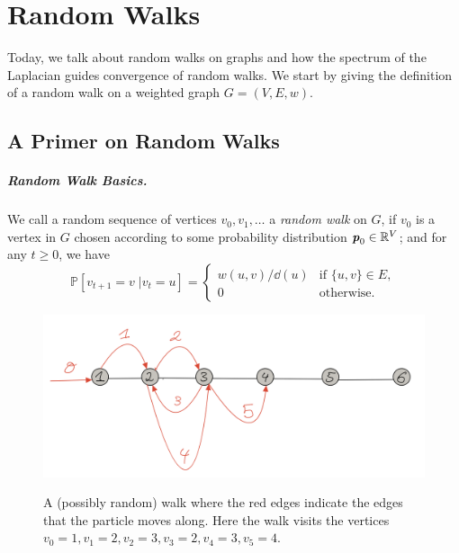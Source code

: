 \newcommand\WWtil{{\tilde{\mathbf{W}}}}
\newcommand\hh{{\boldsymbol{\mathit{h}}}}

\chapter{Random Walks}

\sloppy

Today, we talk about random walks on graphs and how the spectrum of the Laplacian guides convergence of random walks. We start by giving the definition of a random walk on a weighted graph $G=(V,E,w)$.

\section{A Primer on Random Walks}

\paragraph{Random Walk Basics.} We call a random sequence of vertices $v_0, v_1, \dots$ a \emph{random walk} on $G$, if $v_0$ is a vertex in $G$ chosen according to some probability distribution $\boldsymbol{\mathit{p}}_0 \in \mathbb{R}^V$; and for any $t \geq 0$, we have 
\[
\mathbb{P}[v_{t+1} = v \; | v_t = u] = \begin{cases}
    w(u,v)/\dd(u) & \text{if } \{u,v\} \in E,\\
    0 & \text{otherwise}.
\end{cases}
\]

\begin{figure}[!ht]
    \centering\label{fig:randomWalkSimple}
    \includegraphics[scale=0.4]{fig/lec_RandomWalks_fig1.png}
    \caption{A (possibly random) walk where the red edges indicate the edges that the particle moves along. Here the walk visits the vertices $v_0 = 1, v_1 = 2, v_2 = 3, v_3 = 2, v_4 = 3, v_5 = 4$.}
    \label{fig:my_label}
\end{figure}

